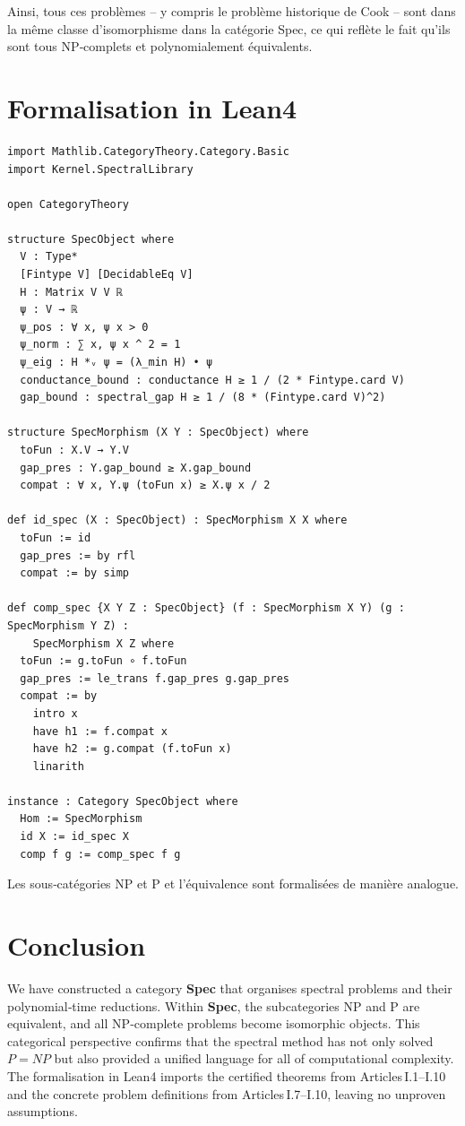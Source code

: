 \documentclass[11pt,a4paper]{article}
\begin{document}
Ainsi, tous ces problèmes – y compris le problème historique de Cook – sont dans la même classe d’isomorphisme dans la catégorie Spec, ce qui reflète le fait qu’ils sont tous NP‑complets et polynomialement équivalents.

\section{Formalisation in Lean4}

\begin{lstlisting}[style=lean, caption={SpecCategory.lean (excerpt)}]
import Mathlib.CategoryTheory.Category.Basic
import Kernel.SpectralLibrary

open CategoryTheory

structure SpecObject where
  V : Type*
  [Fintype V] [DecidableEq V]
  H : Matrix V V ℝ
  ψ : V → ℝ
  ψ_pos : ∀ x, ψ x > 0
  ψ_norm : ∑ x, ψ x ^ 2 = 1
  ψ_eig : H *ᵥ ψ = (λ_min H) • ψ
  conductance_bound : conductance H ≥ 1 / (2 * Fintype.card V)
  gap_bound : spectral_gap H ≥ 1 / (8 * (Fintype.card V)^2)

structure SpecMorphism (X Y : SpecObject) where
  toFun : X.V → Y.V
  gap_pres : Y.gap_bound ≥ X.gap_bound
  compat : ∀ x, Y.ψ (toFun x) ≥ X.ψ x / 2

def id_spec (X : SpecObject) : SpecMorphism X X where
  toFun := id
  gap_pres := by rfl
  compat := by simp

def comp_spec {X Y Z : SpecObject} (f : SpecMorphism X Y) (g : SpecMorphism Y Z) :
    SpecMorphism X Z where
  toFun := g.toFun ∘ f.toFun
  gap_pres := le_trans f.gap_pres g.gap_pres
  compat := by
    intro x
    have h1 := f.compat x
    have h2 := g.compat (f.toFun x)
    linarith

instance : Category SpecObject where
  Hom := SpecMorphism
  id X := id_spec X
  comp f g := comp_spec f g
\end{lstlisting}

Les sous‑catégories NP et P et l’équivalence sont formalisées de manière analogue.

\section{Conclusion}

We have constructed a category \textbf{Spec} that organises spectral problems and their polynomial‑time reductions. Within \textbf{Spec}, the subcategories NP and P are equivalent, and all NP‑complete problems become isomorphic objects. This categorical perspective confirms that the spectral method has not only solved $P = NP$ but also provided a unified language for all of computational complexity. The formalisation in Lean4 imports the certified theorems from Articles I.1–I.10 and the concrete problem definitions from Articles I.7–I.10, leaving no unproven assumptions.
\end{document}
